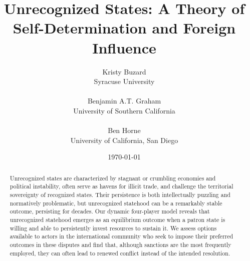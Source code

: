 \documentclass[11pt,letterpaper, notitlepage]{article}
\title{Unrecognized States: A Theory of Self-Determination and Foreign Influence}
\author{Kristy Buzard\\
Syracuse University\\
\\
Benjamin A.T. Graham \\
University of Southern California\\
\\
Ben Horne\\ 
University of California, San Diego}
\date{\today}
\begin{document}
\hypersetup{pageanchor=false}
\begin{titlepage}
\maketitle
\thispagestyle{empty}

\begin{abstract}
\noindent Unrecognized states are characterized by stagnant or crumbling economies and political instability, often serve as havens for illicit trade, and challenge the territorial sovereignty of recognized states. Their persistence is both intellectually puzzling and normatively problematic, but unrecognized statehood can be a remarkably stable outcome, persisting for decades. Our dynamic four-player model reveals that unrecognized statehood emerges as an equilibrium outcome when a patron state is willing and able to persistently invest resources to sustain it. %
We assess options available to actors in the international community who seek to impose their preferred outcomes in these disputes and find that, although sanctions are the most frequently employed, they can often lead to renewed conflict instead of the intended resolution.
\end{abstract}

\end{titlepage}
\hypersetup{pageanchor=true}
\setcounter{page}{1}

\doublespacing
\end{document}
